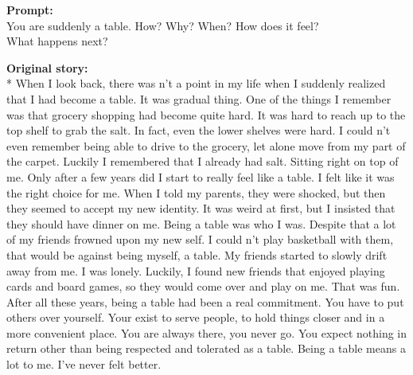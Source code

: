 \begin{breakablefigure}
\footnotesize
    \begin{cpfusetextbox}{\textbf{Prompt:}\\You are suddenly a table. How? Why? When? How does it feel?\\What happens next?}
    \raggedright
        \textbf{Original story:}\\*
        When I look back, there was n't a point in my life when I suddenly realized that I had become a table. It was gradual thing. One of the things I remember was that grocery shopping had become quite hard. It was hard to reach up to the top shelf to grab the salt. In fact, even the lower shelves were hard. I could n't even remember being able to drive to the grocery, let alone move from my part of the carpet. Luckily I remembered that I already had salt. Sitting right on top of me.  Only after a few years did I start to really feel like a table. I felt like it was the right choice for me. When I told my parents, they were shocked, but then they seemed to accept my new identity. It was weird at first, but I insisted that they should have dinner on me. Being a table was who I was.  Despite that a lot of my friends frowned upon my new self. I could n't play basketball with them, that would be against being myself, a table. My friends started to slowly drift away from me. I was lonely. Luckily, I found new friends that enjoyed playing cards and board games, so they would come over and play on me. That was fun.  After all these years, being a table had been a real commitment. You have to put others over yourself. Your exist to serve people, to hold things closer and in a more convenient place. You are always there, you never go. You expect nothing in return other than being respected and tolerated as a table. Being a table means a lot to me. I've never felt better.


\end{cpfusetextbox}
\end{breakablefigure}
